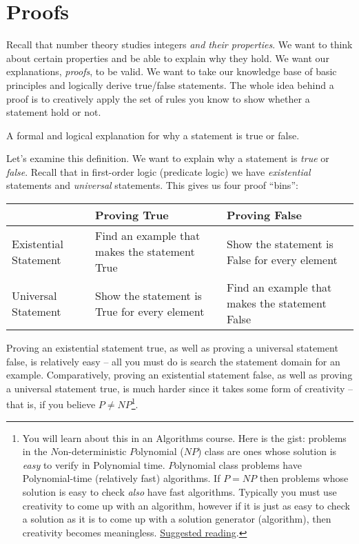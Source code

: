 \documentclass[main.tex]{subfiles}
\begin{document}

\section{Proofs}

Recall that number theory studies integers \textit{and their properties}. We want to think about certain properties and be able to explain why they hold. We want our explanations, \textit{proofs}, to be valid. We want to take our knowledge base of basic principles and logically derive true/false statements. The whole idea behind a proof is to creatively apply the set of rules you know to show whether a statement hold or not.

\begin{defn}
	A formal and logical explanation for why a statement is true or false.
\end{defn}

Let's examine this definition. We want to explain why a statement is \textit{true} or \textit{false}. Recall that in first-order logic (predicate logic) we have \textit{existential} statements and \textit{universal} statements. This gives us four proof ``bins'':

\begin{tabularx}{\textwidth}{lXX}
	\toprule
	& Proving True & Proving False \\
	\midrule
	Existential Statement & Find an example that makes the statement True & Show the statement is False for every element \\
	\midrule
	Universal Statement & Show the statement is True for every element & Find an example that makes the statement False \\
	\bottomrule
\end{tabularx}

Proving an existential statement true, as well as proving a universal statement false, is relatively easy -- all you must do is search the statement domain for an example. Comparatively, proving an existential statement false, as well as proving a universal statement true, is much harder since it takes some form of creativity -- that is, if you believe \(P \neq NP\)\footnote{You will learn about this in an Algorithms course. Here is the gist: problems in the \(N\)on-deterministic \(P\)olynomial (\(NP\)) class are ones whose solution is \textit{easy} to verify in Polynomial time. \(P\)olynomial class problems have Polynomial-time (relatively fast) algorithms. If \(P = NP\) then problems whose solution is easy to check \textit{also} have fast algorithms. Typically you must use creativity to come up with an algorithm, however if it is just as easy to check a solution as it is to come up with a solution generator (algorithm), then creativity becomes meaningless. \href{https://youtu.be/YX40hbAHx3s}{Suggested reading}.}.
\end{document}
